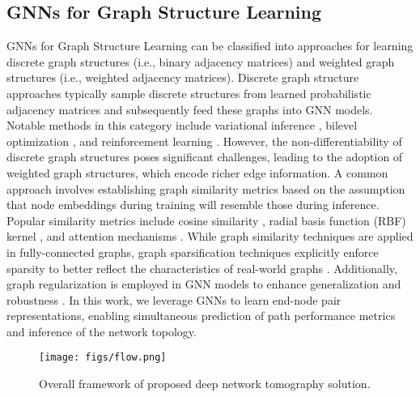\subsection{GNNs for Graph Structure Learning}
GNNs for Graph Structure Learning can be classified into approaches for learning discrete graph structures (i.e., binary adjacency matrices) and weighted graph structures (i.e., weighted adjacency matrices). Discrete graph structure approaches typically sample discrete structures from learned probabilistic adjacency matrices and subsequently feed these graphs into GNN models. Notable methods in this category include variational inference \citep{chen2018structured}, bilevel optimization \citep{franceschi2019learning}, and reinforcement learning \citep{kazemi2020representation}. However, the non-differentiability of discrete graph structures poses significant challenges, leading to the adoption of weighted graph structures, which encode richer edge information. A common approach involves establishing graph similarity metrics based on the assumption that node embeddings during training will resemble those during inference. Popular similarity metrics include cosine similarity \citep{nguyen2010cosine}, radial basis function (RBF) kernel \citep{yeung2007kernel}, and attention mechanisms \citep{chorowski2015attention}. While graph similarity techniques are applied in fully-connected graphs, graph sparsification techniques explicitly enforce sparsity to better reflect the characteristics of real-world graphs \citep{chen2020reinforcement, jin2020graph}. Additionally, graph regularization is employed in GNN models to enhance generalization and robustness \citep{chen2020iterative}. In this work, we leverage GNNs to learn end-node pair representations, enabling simultaneous prediction of path performance metrics and inference of the network topology.

\begin{figure*}[tb]
  \centering
  \texttt{[image: figs/flow.png]}
  \caption{Overall framework of proposed deep network tomography solution.}
  \label{Flow}
  \vspace{-7pt}
\end{figure*}